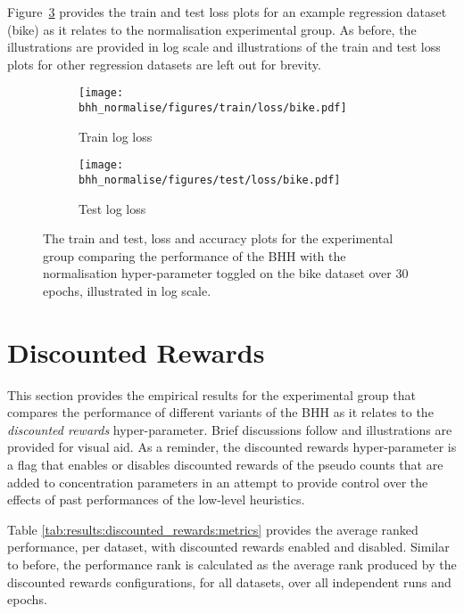 Figure~\ref{fig:results:normalise:figures:bike} provides the train and test loss plots for an example regression dataset (bike) as it relates to the normalisation experimental group. As before, the illustrations are provided in log scale and illustrations of the train and test loss plots for other regression datasets are left out for brevity.


\begin{figure}[htb]
	\begin{subfigure}{0.5\textwidth}
		\centering
		\texttt{[image: bhh\_normalise/figures/train/loss/bike.pdf]}
		\caption{Train log loss}
		\label{fig:results:normalise:figures:loss:train:bike}
	\end{subfigure}
	\begin{subfigure}{0.5\textwidth}
		\centering
		\texttt{[image: bhh\_normalise/figures/test/loss/bike.pdf]}
		\caption{Test log loss}
		\label{fig:results:normalise:figures:loss:test:bike}
	\end{subfigure}
	\par\bigskip
	\caption{The train and test, loss and accuracy plots for the experimental group comparing the performance of the \acs{BHH} with the normalisation hyper-parameter toggled on the bike dataset over 30 epochs, illustrated in log scale.}
	\label{fig:results:normalise:figures:bike}
\end{figure}



\section{Discounted Rewards}\label{sec:results:discounted_rewards}

This section provides the empirical results for the experimental group that compares the performance of different variants of the \acs{BHH} as it relates to the \textit{discounted rewards} hyper-parameter. Brief discussions follow and illustrations are provided for visual aid. As a reminder, the discounted rewards hyper-parameter is a flag that enables or disables discounted rewards of the pseudo counts that are added to concentration parameters in an attempt to provide control over the effects of past performances of the low-level heuristics.

Table \ref{tab:results:discounted_rewards:metrics} provides the average ranked performance, per dataset, with discounted rewards enabled and disabled. Similar to before, the performance rank is calculated as the average rank produced by the discounted rewards configurations, for all datasets, over all independent runs and epochs.

